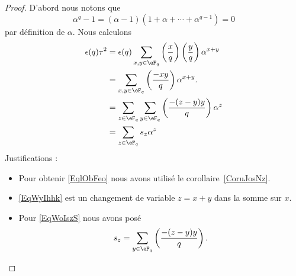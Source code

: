 \begin{proof}
    D'abord nous notons que
    \begin{equation}
        \alpha^q-1=(\alpha-1)(1+\alpha+\cdots+\alpha^{q-1})=0
    \end{equation}
    par définition de \( \alpha\). Nous calculons
    \begin{subequations}
        \begin{align}
            \epsilon(q)\tau^2&=\epsilon(q)\sum_{x,y\in \eF_q}\left(\frac{x}{q}\right)\left(\frac{y}{q}\right)\alpha^{x+y}\\
            &=\sum_{x,y\in \eF_q}\left(\frac{-xy}{q}\right)\alpha^{x+y}. \label{EqlObFeo}\\
            &=\sum_{z\in \eF_q}\sum_{y\in \eF_q}\left(\frac{-(z-y)y}{q}\right)\alpha^{z}    \label{EqWyIhhk}\\
            &=\sum_{z\in \eF_q}s_z\alpha^z  \label{EqWoIszS}
        \end{align}
    \end{subequations}
    Justifications :
    \begin{itemize}
        \item
            Pour obtenir \eqref{EqlObFeo} nous avons utilisé le corollaire~\ref{CoruJosNz}.
        \item
            \eqref{EqWyIhhk} est un changement de variable \( z=x+y\) dans la somme sur \( x\).
        \item
            Pour \eqref{EqWoIszS} nous avons posé
            \begin{equation}
                s_z=\sum_{y\in \eF_q}\left(\frac{-(z-y)y}{q}\right).
            \end{equation}


\end{itemize}
\end{proof}
